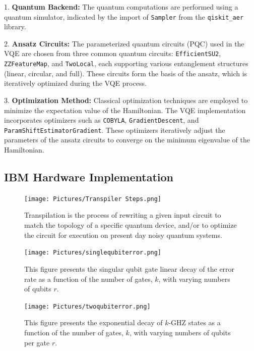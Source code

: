 \documentclass[%
 reprint,
 amsmath,amssymb,
 aps,
]{revtex4-2}
\begin{document}
1. \textbf{Quantum Backend:} The quantum computations are performed using a quantum simulator, indicated by the import of \texttt{Sampler} from the \texttt{qiskit\_aer} library.

2. \textbf{Ansatz Circuits:} The parameterized quantum circuits (PQC) used in the VQE are chosen from three common quantum circuits: \texttt{EfficientSU2}, \texttt{ZZFeatureMap}, and \texttt{TwoLocal}, each supporting various entanglement structures (linear, circular, and full). These circuits form the basis of the ansatz, which is iteratively optimized during the VQE process.

3. \textbf{Optimization Method:} Classical optimization techniques are employed to minimize the expectation value of the Hamiltonian. The VQE implementation incorporates optimizers such as \texttt{COBYLA}, \texttt{GradientDescent}, and \texttt{ParamShiftEstimatorGradient}. These optimizers iteratively adjust the parameters of the ansatz circuits to converge on the minimum eigenvalue of the Hamiltonian. 

\subsection{IBM Hardware Implementation}

\begin{figure}[b]
\texttt{[image: Pictures/Transpiler Steps.png]}
\caption{\label{fig:data} Transpilation is the process of rewriting a given input circuit to match the topology of a specific quantum device, and/or to optimize the circuit for execution on present day noisy quantum systems.}
\end{figure}
\begin{figure}[b]
\texttt{[image: Pictures/singlequbiterror.png]}
\caption{\label{fig:data} This figure presents the singular qubit gate linear decay of the error rate as a function of the number of gates, \(k\), with varying numbers of qubits \(r\).
}
\texttt{[image: Pictures/twoqubiterror.png]}
\caption{\label{fig:data}  This figure presents the exponential decay of \(k\)-GHZ states as a function of the number of gates, \(k\), with varying numbers of qubits per gate \(r\).
}
\end{figure}
\end{document}
